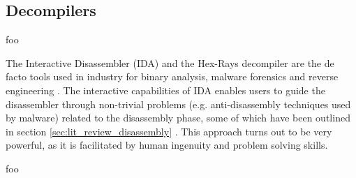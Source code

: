 
\subsection{Decompilers}

foo

The Interactive Disassembler (IDA) and the Hex-Rays decompiler are the de facto tools used in industry for binary analysis, malware forensics and reverse engineering \cite{semantics_preserving_structural_analysis}. The interactive capabilities of IDA enables users to guide the disassembler through non-trivial problems (e.g. anti-disassembly techniques used by malware) related to the disassembly phase, some of which have been outlined in section \ref{sec:lit_review_disassembly} \cite{hexrays}. This approach turns out to be very powerful, as it is facilitated by human ingenuity and problem solving skills.


foo \cite{retargetable_decomp}



